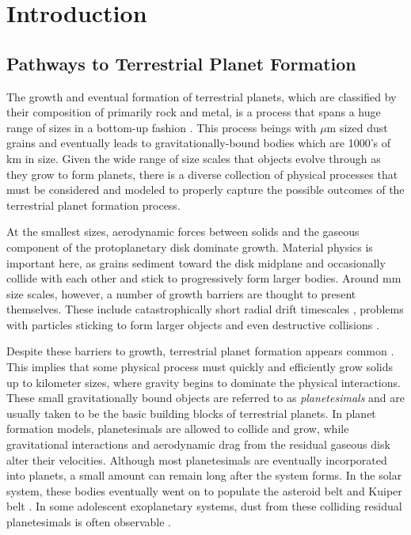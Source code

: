 \chapter {Introduction}

\section{Pathways to Terrestrial Planet Formation}

The growth and eventual formation of terrestrial planets, which are classified by their composition of primarily rock and metal, is a process that spans a huge range of sizes in a bottom-up fashion \cite{safronov72}. This process beings with $\mu$m sized dust grains and eventually leads to gravitationally-bound bodies which are 1000's of km in size. Given the wide range of size scales that objects evolve through as they grow to form planets, there is a diverse collection of physical processes that must be considered and modeled to properly capture the possible outcomes of the terrestrial planet formation process.

At the smallest sizes, aerodynamic forces between solids and the gaseous component of the protoplanetary disk dominate growth. Material physics is important here, as grains sediment toward the disk midplane and occasionally collide with each other and stick \cite{okuzumi12, windmark12, garaud13, katoka13} to progressively form larger bodies.  Around mm size scales, however, a number of growth barriers are thought to present themselves. These include catastrophically short radial drift timescales \cite{adachi76, weidenschilling77}, problems with particles sticking to form larger objects and even destructive collisions \cite{windmark12}.

Despite these barriers to growth, terrestrial planet formation appears common \cite{bonfils13, dressing15, gaidos16}. This implies that some physical process must quickly and efficiently grow solids up to kilometer sizes, where gravity begins to dominate the physical interactions. These small gravitationally bound objects are referred to as \textit{planetesimals} and are usually taken to be the basic building blocks of terrestrial planets. In planet formation models, planetesimals are allowed to collide and grow, while gravitational interactions and aerodynamic drag from the residual gaseous disk alter their velocities. Although most planetesimals are eventually incorporated into planets, a small amount can remain long after the system forms. In the solar system, these bodies eventually went on to populate the asteroid belt and Kuiper belt \cite{duncan89, bottke05, levison08, morbidelli09}. In some adolescent exoplanetary systems, dust from these colliding residual planetesimals is often observable \cite{wyatt08, gaspar20}.

